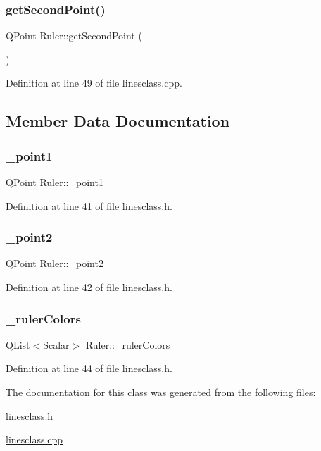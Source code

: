 \subsubsection{\texorpdfstring{getSecondPoint()}{getSecondPoint()}}
{\footnotesize\ttfamily Q\+Point Ruler\+::get\+Second\+Point (\begin{DoxyParamCaption}{ }\end{DoxyParamCaption})}



Definition at line 49 of file linesclass.\+cpp.



\subsection{Member Data Documentation}
\mbox{\label{class_ruler_ae0b82ebbe2c601703de75c6aed392ed3}} 
\subsubsection{\texorpdfstring{\_point1}{\_point1}}
{\footnotesize\ttfamily Q\+Point Ruler\+::\+\_\+point1\hspace{0.3cm}{\ttfamily [private]}}



Definition at line 41 of file linesclass.\+h.

\mbox{\label{class_ruler_aa33c51b7768f1852bea7389502079048}} 
\subsubsection{\texorpdfstring{\_point2}{\_point2}}
{\footnotesize\ttfamily Q\+Point Ruler\+::\+\_\+point2\hspace{0.3cm}{\ttfamily [private]}}



Definition at line 42 of file linesclass.\+h.

\mbox{\label{class_ruler_afa7fe69c326cc41b1ae71a8c69e41559}} 
\subsubsection{\texorpdfstring{\_rulerColors}{\_rulerColors}}
{\footnotesize\ttfamily Q\+List$<$Scalar$>$ Ruler\+::\+\_\+ruler\+Colors\hspace{0.3cm}{\ttfamily [private]}}



Definition at line 44 of file linesclass.\+h.



The documentation for this class was generated from the following files\+:\begin{DoxyCompactItemize}
\item 
\mbox{\hyperlink{linesclass_8h}{linesclass.\+h}}\item 
\mbox{\hyperlink{linesclass_8cpp}{linesclass.\+cpp}}\end{DoxyCompactItemize}
